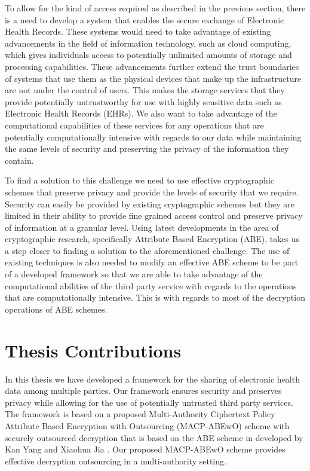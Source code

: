 To allow for the kind of access required as described in the previous section, there is a need to develop a system that enables the secure exchange of Electronic Health Records. These systems would need to take advantage of existing advancements in the field of information technology, such as cloud computing, which gives individuals access to potentially unlimited amounts of storage and processing capabilities. These advancements further extend the trust boundaries of systems that use them as the physical devices that make up the infrastructure are not under the control of users. This makes the storage services that they provide potentially untrustworthy for use with highly sensitive data such as Electronic Health Records (EHRs). We also want to take advantage of the computational capabilities of these services for any operations that are potentially computationally intensive with regards to our data while maintaining the same levels of security and preserving the privacy of the information they contain.

To find a solution to this challenge we need to use effective cryptographic schemes that preserve privacy and provide the levels of security that we require. Security can easily be provided by existing cryptographic schemes but they are limited in their ability to provide fine grained access control and preserve privacy of information at a granular level. Using latest developments in the area of cryptographic research, specifically Attribute Based Encryption (ABE), takes us a step closer to finding a solution to the aforementioned challenge. The use of existing techniques is also needed to modify an effective ABE scheme to be part of a developed framework so that we are able to take advantage of the computational abilities of the third party service with regards to the operations that are computationally intensive. This is with regards to most of the decryption operations of ABE schemes.

\section{Thesis Contributions}

In this thesis we have developed a framework for the sharing of electronic health data among multiple parties. Our framework ensures security and preserves privacy while allowing for the use of potentially untrusted third party services. The framework is based on a proposed Multi-Authority Ciphertext Policy Attribute Based Encryption with Outsourcing (MACP-ABEwO) scheme with securely outsourced decryption that is based on the ABE scheme in developed by Kan Yang and Xiaohua Jia \cite{Yang2014}. Our proposed MACP-ABEwO scheme provides effective decryption outsourcing in a multi-authority setting.

